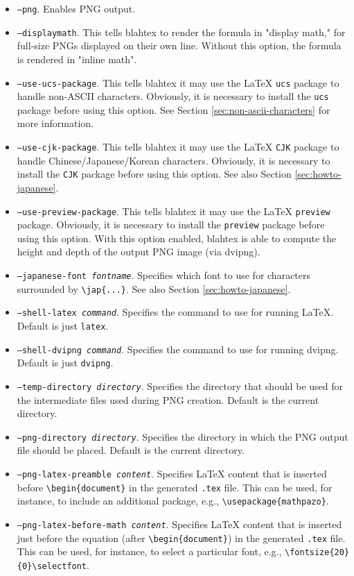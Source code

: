 \documentclass{article}
\newcommand{\texcommand}[1]{\textbackslash{}#1}
\begin{document}
\begin{itemize}
\item \texttt{--png}. Enables PNG output.
\item \texttt{--displaymath}. This tells blahtex to render the formula in "display math," for full-size PNGs displayed on their own line. Without this option, the formula is rendered in "inline math".
\item \texttt{--use-ucs-package}. This tells blahtex it may use the \LaTeX{} \texttt{ucs} package to handle non-ASCII characters. Obviously, it is necessary to install the \texttt{ucs} package before using this option. See Section \ref{sec:non-ascii-characters} for more information.
\item \texttt{--use-cjk-package}. This tells blahtex it may use the \LaTeX{} \texttt{CJK} package to handle Chinese/Japanese/Korean characters. Obviously, it is necessary to install the \texttt{CJK} package before using this option. See also Section \ref{sec:howto-japanese}.
\item \texttt{--use-preview-package}. This tells blahtex it may use the \LaTeX{} \texttt{preview} package. Obviously, it is necessary to install the \texttt{preview} package before using this option. With this option enabled, blahtex is able to compute the height and depth of the output PNG image (via dvipng).
\item \texttt{--japanese-font \textit{fontname}}. Specifies which font to use for characters surrounded by \texttt{\texcommand{jap}\{...\}}. See also Section \ref{sec:howto-japanese}.
\item \texttt{--shell-latex \textit{command}}. Specifies the command to use for running \LaTeX{}. Default is just \texttt{latex}.
\item \texttt{--shell-dvipng \textit{command}}. Specifies the command to use for running dvipng. Default is just \texttt{dvipng}.
\item \texttt{--temp-directory \textit{directory}}. Specifies the directory that should be used for the intermediate files used during PNG creation. Default is the current directory.
\item \texttt{--png-directory \textit{directory}}. Specifies the directory in which the PNG output file should be placed. Default is the current directory.
\item \texttt{--png-latex-preamble \textit{content}}. Specifies LaTeX content that is inserted before \verb|\begin{document}| in the generated \texttt{.tex} file. This can be used, for instance, to include an additional package, e.g., \verb|\usepackage{mathpazo}|.
\item \texttt{--png-latex-before-math \textit{content}}. Specifies LaTeX content that is inserted just before the equation (after \verb|\begin{document}|) in the generated \texttt{.tex} file. This can be used, for instance, to select a particular font, e.g., \verb|\fontsize{20}{0}\selectfont|.
\end{itemize}
\end{document}
